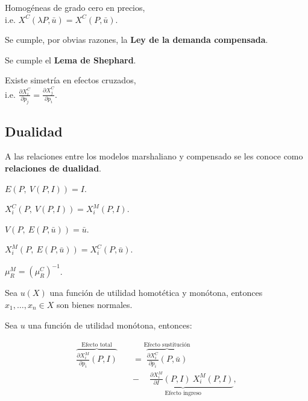\documentclass[8pt,a4paper]{extarticle}
\begin{document}
\begin{multicols}{3}
\begin{eqlist}
\item Homogéneas de grado cero en precios, \\ i.e. $X^C (\lambda P, \bar{u}) = X^C (P, \bar{u})$.
\item Se cumple, por obvias razones, la \textbf{Ley de la demanda compensada}.
\item Se cumple el \textbf{Lema de Shephard}.
\item Existe simetría en efectos cruzados, \\ i.e. $\displaystyle \frac{\partial X_i^C}{\partial p_j} = \frac{\partial X_j^C}{\partial p_i}$.
\end{eqlist}

\subsection{Dualidad}

A las relaciones entre los modelos marshaliano y compensado se les conoce como \textbf{relaciones de dualidad}.

\begin{eqlist}
\item $E (P,\ V(P, I))=I$.
\item $X_i^C (P,\ V(P, I)) = X_i^M (P, I)$.
\item $V(P,\ E(P, \bar{u})) = \bar{u}$.
\item $X_i^M (P,\ E(P, \bar{u})) = X_i^C (P, \bar{u})$.
\item $\mu_R^M = \displaystyle \left(\mu_R^C\right)^{-1}$.
\end{eqlist}

\begin{boxprop}
	Sea $u(X)$ una función de utilidad homotética y monótona, entonces $x_1, \ldots, x_n \in X$ son bienes normales.
\end{boxprop}

\begin{boxtheo}
	Sea $u$ una función de utilidad monótona, entonces:
	
	\begin{equation*}
	\begin{aligned}
		\overbrace{\frac{\partial X^M_i}{\partial p_i} (P, I)}^{\text{Efecto total}} \quad &= \overbrace{\frac{\partial X^C_i}{\partial p_i} (P, \bar{u})}^{\text{Efecto sustitución}} \\
		& \underbrace{ - \quad\ \frac{\partial X_i^M}{\partial I} (P, I)\ X^M_i (P,I)}_{\text{Efecto ingreso}},
	\end{aligned}
	\end{equation*}
	

\end{boxtheo}
\end{multicols}
\end{document}
